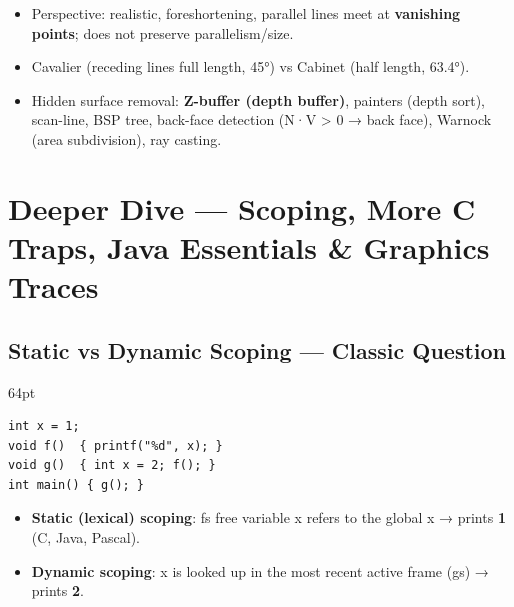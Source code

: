 

\begin{itemize}
\tightlist
\item
  Perspective: realistic, foreshortening, parallel lines meet at \textbf{vanishing points}; does not preserve parallelism/size.
\item
  Cavalier (receding lines full length, 45°) vs Cabinet (half length, 63.4°).
\item
  Hidden surface removal: \textbf{Z-buffer (depth buffer)}, painter\textquotesingle s (depth sort), scan-line, BSP tree, back-face detection (N·V \textgreater{} 0 → back face), Warnock (area subdivision), ray casting.
\end{itemize}

\needspace{150pt}

\hypertarget{p2-03--7-deeper-dive--scoping-more-c-traps-java-essentials--graphics-traces}{%
\section{Deeper Dive --- Scoping, More C Traps, Java Essentials \& Graphics Traces}\label{p2-03--7-deeper-dive--scoping-more-c-traps-java-essentials--graphics-traces}}

\needspace{114pt}

\hypertarget{p2-03--71-static-vs-dynamic-scoping--classic-question}{%
\subsection{Static vs Dynamic Scoping --- Classic Question}\label{p2-03--71-static-vs-dynamic-scoping--classic-question}}

\begin{listingblock}{64pt}
\begin{Verbatim}[fontsize=\fontsize{9.0}{10.9}\selectfont]
int x = 1;
void f()  { printf("%d", x); }
void g()  { int x = 2; f(); }
int main() { g(); }
\end{Verbatim}
\end{listingblock}

\begin{itemize}
\tightlist
\item
  \textbf{Static (lexical) scoping}: f\textquotesingle s free variable x refers to the global x → prints \textbf{1} (C, Java, Pascal).
\item
  \textbf{Dynamic scoping}: x is looked up in the most recent active frame (g\textquotesingle s) → prints \textbf{2}.
\end{itemize}

